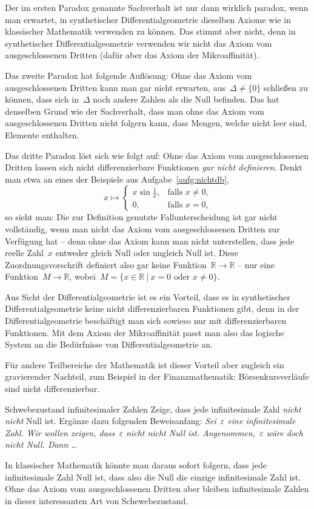 \documentclass[twoside]{../zirkelblatt}
\newcommand{\RR}{\mathbb{R}}
\theoremstyle{definition}
\theoremstyle{plain}
\theoremstyle{remark}
\begin{document}
Der im ersten Paradox genannte Sachverhalt ist nur dann wirklich paradox, wenn
man erwartet, in synthetischer Differentialgeometrie dieselben Axiome wie in
klassischer Mathematik verwenden zu können. Das stimmt aber nicht, denn in
synthetischer Differentialgeometrie verwenden wir nicht das Axiom vom
ausgeschlossenen Dritten (dafür aber das Axiom der Mikroaffinität).

Das zweite Paradox hat folgende Auflösung: Ohne das Axiom vom ausgeschlossenen
Dritten kann man gar nicht erwarten, aus~$\Delta \neq \{0\}$ schließen zu
können, dass sich in~$\Delta$ noch andere Zahlen als die Null befinden.
Das hat denselben Grund wie der Sachverhalt, dass man ohne das Axiom vom
ausgeschlossenen Dritten nicht folgern kann, dass Mengen, welche nicht leer
sind, Elemente enthalten.

Das dritte Paradox löst sich wie folgt auf: Ohne das Axiom vom ausgeschlossenen
Dritten lassen sich nicht differenzierbare Funktionen \emph{gar nicht definieren}.
Denkt man etwa an eines der Beispiele aus Aufgabe~\ref{aufg:nichtdb},
\[ x \longmapsto \begin{cases}x \sin\frac{1}{x}, & \text{falls $x \neq 0$,} \\
0, & \text{falls $x = 0$,}\end{cases} \]
so sieht man: Die zur Definition genutzte Fallunterscheidung ist gar nicht
vollständig, wenn man nicht das Axiom vom ausgeschlossenen Dritten zur
Verfügung hat -- denn ohne das Axiom kann man nicht unterstellen, dass jede reelle
Zahl~$x$ entweder gleich Null oder ungleich Null ist. Diese
Zuordnungsvorschrift definiert also gar keine Funktion~$\RR \to \RR$ -- nur
eine Funktion~$M \to \RR$, wobei~$M = \{ x \in \RR \ |\ \text{$x = 0$ oder $x \neq 0$} \}$.

Aus Sicht der Differentialgeometrie ist es ein Vorteil, dass es in
synthetischer Differentialgeometrie keine nicht differenzierbaren Funktionen
gibt, denn in der Differentialgeometrie beschäftigt man sich sowieso nur mit
differenzierbaren Funktionen. Mit dem Axiom der Mikroaffinität passt man also
das logische System an die Bedürfnisse von Differentialgeometrie an.

Für andere Teilbereiche der Mathematik ist dieser Vorteil aber zugleich ein
gravierender Nachteil, zum Beispiel in der Finanzmathematik: Börsenkursverläufe
sind nicht differenzierbar.

\begin{aufgabeShaded}{Schwebezustand infinitesimaler Zahlen}
Zeige, dass jede infinitesimale Zahl \emph{nicht nicht} Null ist. Ergänze dazu
folgenden Be\-weis\-an\-fang:
\emph{Sei~$\varepsilon$ eine infinitesimale Zahl. Wir wollen zeigen,
dass~$\varepsilon$ \emph{nicht nicht} Null ist. Angenommen,~$\varepsilon$ wäre
doch nicht Null. Dann \ldots}

In klassischer Mathematik könnte man daraus sofort folgern, dass jede
infinitesimale Zahl Null ist, dass also die Null die einzige infinitesimale
Zahl ist. Ohne das Axiom vom ausgeschlossenen Dritten aber bleiben
infinitesimale Zahlen in dieser interessanten Art von Schewebezustand.
\end{aufgabeShaded}
\end{document}
